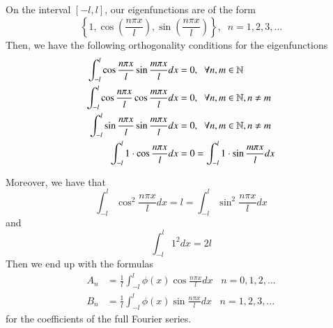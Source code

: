 \documentclass[12pt, a4paper, oneside, openright, titlepage]{book}
\begin{document}
\begin{prop}
    On the interval $[-l,l]$, our eigenfunctions are of the form \begin{equation*}
        \left\{1, \cos\left(\frac{n\pi x}{l}\right),\sin\left(\frac{n\pi x}{l}\right)\right\},\;\;n=1,2,3,...
    \end{equation*}
    Then, we have the following orthogonality conditions for the eigenfunctions \begin{align*}
        \int_{-l}^l\cos\frac{n\pi x}{l}\sin\frac{m\pi x}{l}dx &= 0,\;\;\forall n,m \in \mathbb N \\
        \int_{-l}^l\cos\frac{n\pi x}{l}\cos\frac{m\pi x}{l}dx &= 0,\;\;\forall n,m \in \mathbb N, n\neq m \\
        \int_{-l}^l\sin\frac{n\pi x}{l}\sin\frac{m\pi x}{l}dx &= 0,\;\;\forall n,m \in \mathbb N, n \neq m \\
        \int_{-l}^l1\cdot \cos\frac{n\pi x}{l}dx &= 0 = \int_{-l}^l1\cdot \sin\frac{m \pi x}{l}dx
    \end{align*}
\end{prop}
Moreover, we have that \begin{equation*}
    \int_{-l}^l\cos^2\frac{n\pi x}{l}dx = l = \int_{-l}^l\sin^2\frac{n\pi x}{l}dx
\end{equation*}
and \begin{equation*}
    \int_{-l}^l1^2dx = 2l
\end{equation*}
Then we end up with the formulas \begin{align}
    A_n &= \frac{1}{l}\int_{-l}^l\phi(x)\cos\frac{n\pi x}{l}dx\;\;\;n=0,1,2,... \\
    B_n &= \frac{1}{l}\int_{-l}^l\phi(x)\sin\frac{n\pi x}{l}dx\;\;\;n=1,2,3,...
\end{align}
for the coefficients of the full Fourier series.
\end{document}
